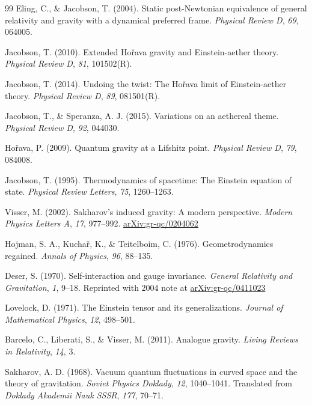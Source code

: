 \begin{thebibliography}{99}
Eling, C., \& Jacobson, T. (2004). Static post-Newtonian equivalence of general relativity and gravity with a dynamical preferred frame. \emph{Physical Review D}, \emph{69}, 064005.

Jacobson, T. (2010). Extended Ho\v{r}ava gravity and Einstein-aether theory. \emph{Physical Review D}, \emph{81}, 101502(R).

Jacobson, T. (2014). Undoing the twist: The Ho\v{r}ava limit of Einstein-aether theory. \emph{Physical Review D}, \emph{89}, 081501(R).

Jacobson, T., \& Speranza, A. J. (2015). Variations on an aethereal theme. \emph{Physical Review D}, \emph{92}, 044030.

Ho\v{r}ava, P. (2009). Quantum gravity at a Lifshitz point. \emph{Physical Review D}, \emph{79}, 084008.

Jacobson, T. (1995). Thermodynamics of spacetime: The Einstein equation of state. \emph{Physical Review Letters}, \emph{75}, 1260--1263.

Visser, M. (2002). Sakharov's induced gravity: A modern perspective. \emph{Modern Physics Letters A}, \emph{17}, 977--992. \href{https://arxiv.org/abs/gr-qc/0204062}{arXiv:gr-qc/0204062}

Hojman, S. A., Kucha\v{r}, K., \& Teitelboim, C. (1976). Geometrodynamics regained. \emph{Annals of Physics}, \emph{96}, 88--135.

Deser, S. (1970). Self-interaction and gauge invariance. \emph{General Relativity and Gravitation}, \emph{1}, 9--18. Reprinted with 2004 note at \href{https://arxiv.org/abs/gr-qc/0411023}{arXiv:gr-qc/0411023}

Lovelock, D. (1971). The Einstein tensor and its generalizations. \emph{Journal of Mathematical Physics}, \emph{12}, 498--501.

Barcelo, C., Liberati, S., \& Visser, M. (2011). Analogue gravity. \emph{Living Reviews in Relativity}, \emph{14}, 3.

Sakharov, A. D. (1968). Vacuum quantum fluctuations in curved space and the theory of gravitation. \emph{Soviet Physics Doklady}, \emph{12}, 1040--1041. Translated from \emph{Doklady Akademii Nauk SSSR}, \emph{177}, 70--71.

\end{thebibliography}
\endgroup
